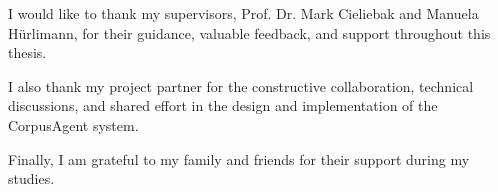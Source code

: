 
\begin{acknowledgements}
\addchaptertocentry{\acknowledgementname} %

I would like to thank my supervisors, Prof. Dr. Mark Cieliebak and Manuela Hürlimann, for their guidance, valuable feedback, and support throughout this thesis.

I also thank my project partner for the constructive collaboration, technical discussions, and shared effort in the design and implementation of the CorpusAgent system.

Finally, I am grateful to my family and friends for their support during my studies.
\end{acknowledgements}
